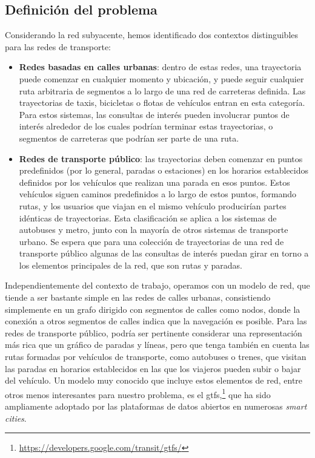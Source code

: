 \subsection{Definici\'on del problema}

    Considerando la red subyacente, hemos identificado dos contextos distinguibles para las redes de transporte:
    
    \begin{itemize}
    	\item \textbf{Redes basadas en calles urbanas}: dentro de estas redes, una trayectoria puede comenzar en cualquier momento y ubicaci\'on, y puede seguir cualquier ruta arbitraria de segmentos a lo largo de una red de carreteras definida.
        Las trayectorias de taxis, bicicletas o flotas de veh\'iculos entran en esta categor\'ia. Para estos sistemas, las consultas de inter\'es pueden involucrar puntos de inter\'es alrededor de los cuales podr\'ian terminar estas trayectorias, o segmentos de carreteras que podr\'ian ser parte de una ruta.
        
    	\item \textbf{Redes de transporte p\'ublico}: las trayectorias deben comenzar en puntos predefinidos (por lo general, paradas o estaciones) en los horarios establecidos definidos por los veh\'iculos que realizan una parada en esos puntos. Estos veh\'iculos siguen caminos predefinidos a lo largo de estos puntos, formando rutas, y los usuarios que viajan en el mismo veh\'iculo producir\'ian partes id\'enticas de trayectorias.
    Esta clasificaci\'on se aplica a los sistemas de autobuses y metro, junto con la mayor\'ia de otros sistemas de transporte urbano. Se espera que para una colecci\'on de trayectorias de una red de transporte p\'ublico algunas de las consultas de inter\'es puedan girar en torno a los elementos principales de la red, que son rutas y paradas.
    \end{itemize}
    
    Independientemente del contexto de trabajo, operamos con un modelo de red, que tiende a ser bastante simple en las redes de calles urbanas, consistiendo simplemente en un grafo dirigido con segmentos de calles como nodos, donde la conexi\'on a otros segmentos de calles indica que la navegaci\'on es posible. Para las redes de transporte p\'ublico, podr\'ia ser pertinente considerar una representaci\'on m\'as rica que un gr\'afico de paradas y l\'ineas, pero que tenga tambi\'en en cuenta las rutas formadas por veh\'iculos de transporte, como autobuses o trenes, que visitan las paradas en horarios establecidos en las que los viajeros pueden subir o bajar del veh\'iculo. Un modelo muy conocido que incluye estos elementos de red, entre otros menos interesantes para nuestro problema, es el \gls{gtfs},\footnote{\url{https://developers.google.com/transit/gtfs/}} que ha sido ampliamente adoptado por las plataformas de datos abiertos en numerosas \textit{smart cities}.
    
